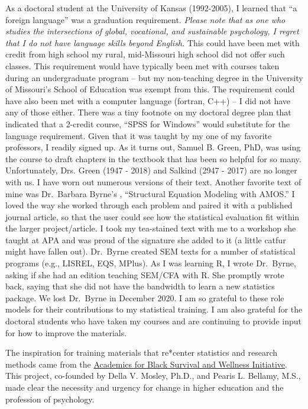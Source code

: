 \documentclass[
  11pt,
]{book}
\begin{document}
As a doctoral student at the University of Kansas (1992-2005), I learned that ``a foreign language'' was a graduation requirement. \emph{Please note that as one who studies the intersections of global, vocational, and sustainable psychology, I regret that I do not have language skills beyond English.} This could have been met with credit from high school my rural, mid-Missouri high school did not offer such classes. This requirement would have typically been met with courses taken during an undergraduate program -- but my non-teaching degree in the University of Missouri's School of Education was exempt from this. The requirement could have also been met with a computer language (fortran, C++) -- I did not have any of those either. There was a tiny footnote on my doctoral degree plan that indicated that a 2-credit course, ``SPSS for Windows'' would substitute for the language requirement. Given that it was taught by my one of my favorite professors, I readily signed up. As it turns out, Samuel B. Green, PhD, was using the course to draft chapters in the textbook \citep{green_using_2014} that has been so helpful for so many. Unfortunately, Drs. Green (1947 - 2018) and Salkind (2947 - 2017) are no longer with us. I have worn out numerous versions of their text. Another favorite text of mine was Dr.~Barbara Byrne's \citeyearpar{byrne_structural_2016}, ``Structural Equation Modeling with AMOS.'' I loved the way she worked through each problem and paired it with a published journal article, so that the user could see how the statistical evaluation fit within the larger project/article. I took my tea-stained text with me to a workshop she taught at APA and was proud of the signature she added to it (a little catfur might have fallen out). Dr.~Byrne created SEM texts for a number of statistical programs (e.g., LISREL, EQS, MPlus). As I was learning R, I wrote Dr.~Byrne, asking if she had an edition teaching SEM/CFA with R. She promptly wrote back, saying that she did not have the bandwidth to learn a new statistics package. We lost Dr.~Byrne in December 2020. I am so grateful to these role models for their contributions to my statistical training. I am also grateful for the doctoral students who have taken my courses and are continuing to provide input for how to improve the materials.

The inspiration for training materials that re*center statistics and research methods came from the \href{https://www.academics4blacklives.com/}{Academics for Black Survival and Wellness Initiative}. This project, co-founded by Della V. Mosley, Ph.D., and Pearis L. Bellamy, M.S., made clear the necessity and urgency for change in higher education and the profession of psychology.
\end{document}

